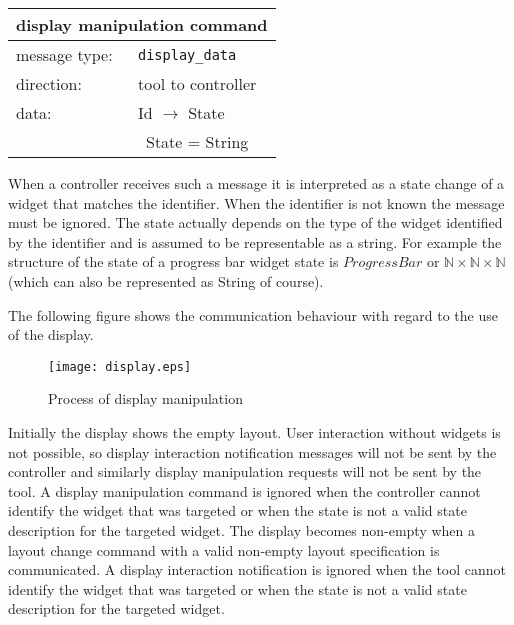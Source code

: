 \documentclass{article}
\newcommand{\msg}[1]{\texttt{#1}}
\begin{document}
   \begin{table}[H]
    \begin{center}
     \begin{tabular}{|ll|}
      \hline
       \multicolumn{2}{|l|}{\textbf{display manipulation command}} \\
      \hline
       message type:   & \msg{display\_data} \\
      \hline
       direction:      & tool to controller \\
       data:           & Id $\rightarrow$ State \\
                       & \ State = String \\
      \hline
     \end{tabular}
    \end{center}
   \vspace{-0.4cm}
   \end{table}

   \noindent When a controller receives such a message it is interpreted as a
   state change of a widget that matches the identifier. When the identifier is
   not known the message must be ignored. The state actually depends on the
   type of the widget identified by the identifier and is assumed to be
   representable as a string.  For example the structure of the state of a
   progress bar widget state is $ProgressBar$ or $\mathbb{N} \times \mathbb{N}
   \times \mathbb{N}$ (which can also be represented as String of course).


   The following figure shows the communication behaviour with regard to the
   use of the display.
   
   \begin{figure}[H]
    \begin{center}
     \texttt{[image: display.eps]}
    \end{center}
    \vspace{-0.4cm}
    \caption{Process of display manipulation}
   \end{figure}

   \noindent Initially the display shows the empty layout. User interaction
   without widgets is not possible, so display interaction notification
   messages will not be sent by the controller and similarly display
   manipulation requests will not be sent by the tool. A display manipulation
   command is ignored when the controller cannot identify the widget that was
   targeted or when the state is not a valid state description for the targeted
   widget. The display becomes non-empty when a layout change command with a
   valid non-empty layout specification is communicated.  A display interaction
   notification is ignored when the tool cannot identify the widget that was
   targeted or when the state is not a valid state description for the targeted
   widget. 
   
\end{document}
